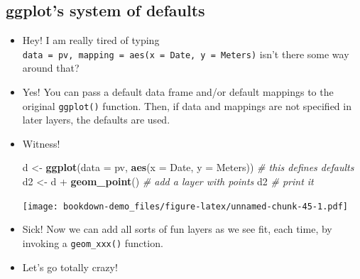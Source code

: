 \documentclass[]{book}
\newenvironment{Shaded}{\begin{snugshade}}{\end{snugshade}}
\newcommand{\KeywordTok}[1]{\textcolor[rgb]{0.13,0.29,0.53}{\textbf{{#1}}}}
\newcommand{\DataTypeTok}[1]{\textcolor[rgb]{0.13,0.29,0.53}{{#1}}}
\newcommand{\StringTok}[1]{\textcolor[rgb]{0.31,0.60,0.02}{{#1}}}
\newcommand{\CommentTok}[1]{\textcolor[rgb]{0.56,0.35,0.01}{\textit{{#1}}}}
\newcommand{\NormalTok}[1]{{#1}}
\theoremstyle{definition}
\theoremstyle{definition}
\theoremstyle{remark}
\begin{document}
\subsection{ggplot's system of
defaults}\label{ggplots-system-of-defaults}

\begin{itemize}
\item
  Hey! I am really tired of typing
  \texttt{data\ =\ pv,\ mapping\ =\ aes(x\ =\ Date,\ y\ =\ Meters)}
  isn't there some way around that?
\item
  Yes! You can pass a default data frame and/or default mappings to the
  original \texttt{ggplot()} function. Then, if data and mappings are
  not specified in later layers, the defaults are used.
\item
  Witness!

\begin{Shaded}
\begin{Highlighting}[]
\NormalTok{d <-}\StringTok{ }\KeywordTok{ggplot}\NormalTok{(}\DataTypeTok{data =} \NormalTok{pv, }\KeywordTok{aes}\NormalTok{(}\DataTypeTok{x =} \NormalTok{Date, }\DataTypeTok{y =} \NormalTok{Meters))  }\CommentTok{# this defines defaults}
\NormalTok{d2 <-}\StringTok{ }\NormalTok{d +}\StringTok{ }\KeywordTok{geom_point}\NormalTok{()  }\CommentTok{# add a layer with points}
\NormalTok{d2  }\CommentTok{# print it}
\end{Highlighting}
\end{Shaded}

  \texttt{[image: bookdown-demo\_files/figure-latex/unnamed-chunk-45-1.pdf]}
\item
  Sick! Now we can add all sorts of fun layers as we see fit, each time,
  by invoking a \texttt{geom\_xxx()} function.
\item
  Let's go totally crazy!
\end{itemize}
\end{document}
